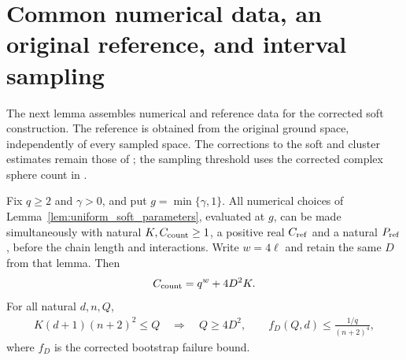 \section{Common numerical data, an original reference, and interval sampling}
\label{sec:physical_soft_sampling_data}

The next lemma assembles numerical and reference data for the corrected
soft construction. The reference is obtained from the original ground space,
independently of every sampled space. The corrections to the soft and cluster
estimates remain those of
\cite{gap:alvv16_soft_regional_residuals,gap:alvv16_cluster_approximation};
the sampling threshold uses the corrected complex sphere count in
\cite{gap:alvv16_random_sampling_net_count}.

\begin{lemma}
    \label{lem:physical_soft_sampling_data}
    \leanok
    Fix $q\ge2$ and $\gamma>0$, and put $g=\min\{\gamma,1\}$.
    All numerical choices of Lemma~\ref{lem:uniform_soft_parameters},
    evaluated at $g$, can be made simultaneously with natural
    $K,C_{\rm count}\ge1$, a positive real $C_{\rm ref}$ and a natural
    $P_{\rm ref}$, before the chain length and interactions.
    Write $w=4\ell$ and retain the same $D$ from that lemma. Then
    \begin{align}
        C_{\rm count}=q^w+4D^2K.
        \label{eq:physical_soft_common_count_constant}
    \end{align}
    For all natural $d,n,Q$,
    \begin{align}
        K(d+1)(n+2)^2\le Q\quad\Longrightarrow\quad
        Q\ge4D^2,\qquad f_D(Q,d)\le\frac{1/q}{(n+2)^4},
        \label{eq:physical_soft_common_threshold}
    \end{align}
    where $f_D$ is the corrected bootstrap failure bound.


\end{lemma}
